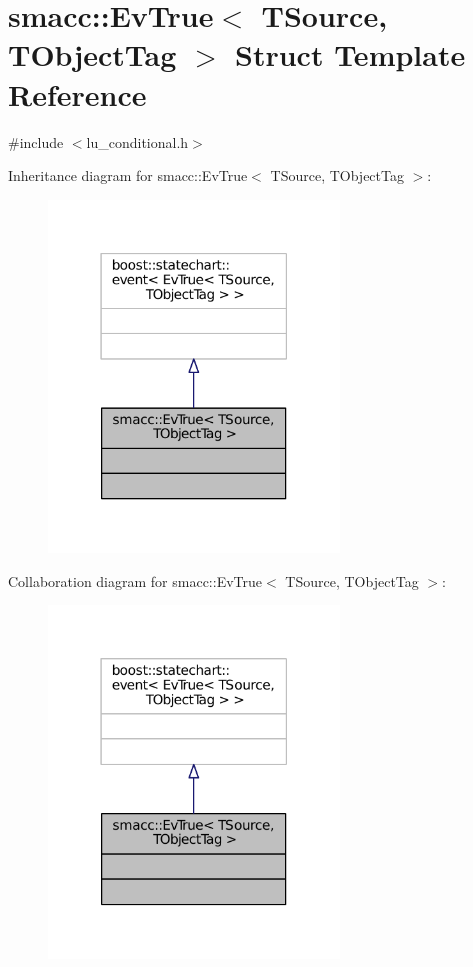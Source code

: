 \hypertarget{structsmacc_1_1EvTrue}{}\section{smacc\+:\+:Ev\+True$<$ T\+Source, T\+Object\+Tag $>$ Struct Template Reference}
\label{structsmacc_1_1EvTrue}


{\ttfamily \#include $<$lu\+\_\+conditional.\+h$>$}



Inheritance diagram for smacc\+:\+:Ev\+True$<$ T\+Source, T\+Object\+Tag $>$\+:
\nopagebreak
\begin{figure}[H]
\begin{center}
\leavevmode
\includegraphics[width=219pt]{structsmacc_1_1EvTrue__inherit__graph}
\end{center}
\end{figure}


Collaboration diagram for smacc\+:\+:Ev\+True$<$ T\+Source, T\+Object\+Tag $>$\+:
\nopagebreak
\begin{figure}[H]
\begin{center}
\leavevmode
\includegraphics[width=219pt]{structsmacc_1_1EvTrue__coll__graph}
\end{center}
\end{figure}


